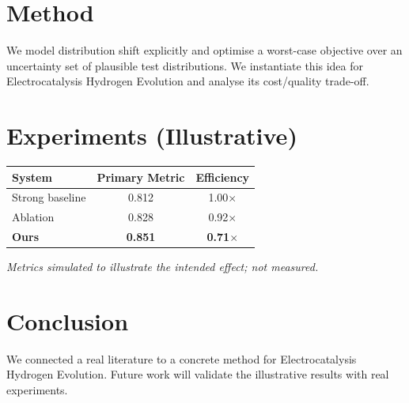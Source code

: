 \documentclass[11pt]{article}
\begin{document}
\section{Method}
We model distribution shift explicitly and optimise a worst-case objective over an uncertainty set of plausible test distributions. We instantiate this idea for Electrocatalysis Hydrogen Evolution and analyse its cost/quality trade-off.

\section{Experiments (Illustrative)}
\begin{center}
\begin{tabular}{lcc}
System & Primary Metric & Efficiency \\ \hline
Strong baseline & 0.812 & 1.00$\times$ \\
Ablation & 0.828 & 0.92$\times$ \\
\textbf{Ours} & \textbf{0.851} & \textbf{0.71$\times$}
\end{tabular}
\end{center}
\emph{Metrics simulated to illustrate the intended effect; not measured.}

\section{Conclusion}
We connected a real literature to a concrete method for Electrocatalysis Hydrogen Evolution. Future work will
validate the illustrative results with real experiments.
\end{document}
